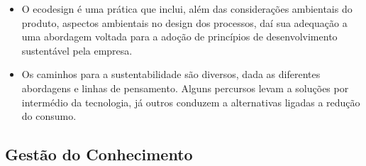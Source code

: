 \documentclass{article}
\begin{document}
\begin{itemize}
\begin{itemize}
    \end{itemize}
    \item O ecodesign é uma prática que inclui, além das considerações ambientais do produto, aspectos ambientais no design dos processos, daí sua adequação a uma abordagem voltada para a adoção de princípios de desenvolvimento sustentável pela empresa.
    \item Os caminhos para a sustentabilidade são diversos, dada as diferentes abordagens e linhas de pensamento. Alguns percursos levam a soluções por intermédio da tecnologia, já outros conduzem a alternativas ligadas a redução do consumo.
\end{itemize}

\subsection{Gestão do Conhecimento}
\end{document}
